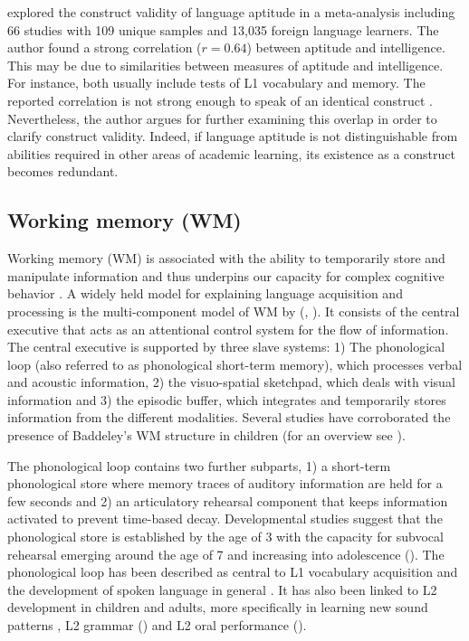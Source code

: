 \documentclass[output=paper]{langscibook}
\begin{document}
\citet{Li2016} explored the construct validity of language aptitude in a meta-ana\-ly\-sis including 66 studies with 109 unique samples and 13,035 foreign language learners. The author found a strong correlation ($r=0.64$) between aptitude and intelligence. This may be due to similarities between measures of aptitude and intelligence. For instance, both usually include tests of L1 vocabulary and memory. The reported correlation is not strong enough to speak of an identical construct \citep{Li2016}. Nevertheless, the author argues for further examining this overlap in order to clarify construct validity. Indeed, if language aptitude is not distinguishable from abilities required in other areas of academic learning, its existence as a construct becomes redundant. 

\subsection{Working memory (WM)} %

Working memory (WM) is associated with the ability to temporarily store and manipulate information and thus underpins our capacity for complex cognitive behavior \citep{Baddeley2003}. A widely held model for explaining language acquisition and processing is the multi-component model of WM by \citeauthor{BaddeleyHitch1974} (\citeyear{BaddeleyHitch1974}, \citealt{Baddeley2000}). It consists of the central executive that acts as an attentional control system for the flow of information. The central executive is supported by three slave systems: 1) The phonological loop (also referred to as phonological short-term memory), which processes verbal and acoustic information, 2) the visuo-spatial sketchpad, which deals with visual information and 3) the episodic buffer, which integrates and temporarily stores information from the different modalities. Several studies have corroborated the presence of Baddeley’s WM structure in children (for an overview see \citealt{BoyleEtAl2013}). 

The phonological loop contains two further subparts, 1) a short-term phonological store where memory traces of auditory information are held for a few seconds and 2) an articulatory rehearsal component that keeps information activated to prevent time-based decay. Developmental studies suggest that the phonological store is established by the age of 3 with the capacity for subvocal rehearsal emerging around the age of 7 and increasing into adolescence (\citealt{HasselhornGrube2003}). The phonological loop has been described as central to L1 vocabulary acquisition and the development of spoken language in general \citep{BaddeleyEtAl1998}. It has also been linked to L2 development in children and adults, more specifically in learning new sound patterns \citep{SpecialeEtAl2004}, L2 grammar (\citealt{FrenchOBrien2008}) and L2 oral performance (\citealt{OBrienEtAl2006}). 
\end{document}
